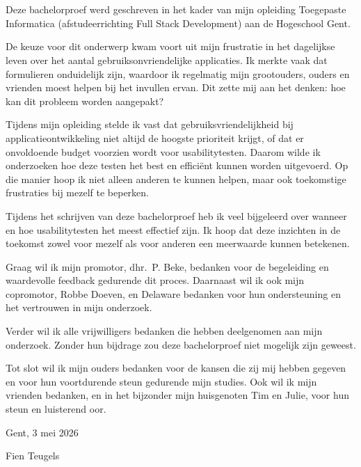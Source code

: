 
\chapter*{}%
\label{ch:voorwoord}

Deze bachelorproef werd geschreven in het kader van mijn opleiding Toegepaste Informatica (afstudeerrichting Full Stack Development) aan de Hogeschool Gent.

De keuze voor dit onderwerp kwam voort uit mijn frustratie in het dagelijkse leven over het aantal gebruiksonvriendelijke applicaties. Ik merkte vaak dat formulieren onduidelijk zijn, waardoor ik regelmatig mijn grootouders, ouders en vrienden moest helpen bij het invullen ervan. Dit zette mij aan het denken: hoe kan dit probleem worden aangepakt?

Tijdens mijn opleiding stelde ik vast dat gebruiksvriendelijkheid bij applicatieontwikkeling niet altijd de hoogste prioriteit krijgt, of dat er onvoldoende budget voorzien wordt voor usabilitytesten. Daarom wilde ik onderzoeken hoe deze testen het best en efficiënt kunnen worden uitgevoerd. Op die manier hoop ik niet alleen anderen te kunnen helpen, maar ook toekomstige frustraties bij mezelf te beperken.

Tijdens het schrijven van deze bachelorproef heb ik veel bijgeleerd over wanneer en hoe usabilitytesten het meest effectief zijn. Ik hoop dat deze inzichten in de toekomst zowel voor mezelf als voor anderen een meerwaarde kunnen betekenen.

Graag wil ik mijn promotor, dhr.\ P. Beke, bedanken voor de begeleiding en waardevolle feedback gedurende dit proces. Daarnaast wil ik ook mijn copromotor, Robbe Doeven, en Delaware bedanken voor hun ondersteuning en het vertrouwen in mijn onderzoek.

Verder wil ik alle vrijwilligers bedanken die hebben deelgenomen aan mijn onderzoek. Zonder hun bijdrage zou deze bachelorproef niet mogelijk zijn geweest.

Tot slot wil ik mijn ouders bedanken voor de kansen die zij mij hebben gegeven en voor hun voortdurende steun gedurende mijn studies. Ook wil ik mijn vrienden bedanken, en in het bijzonder mijn huisgenoten Tim en Julie, voor hun steun en luisterend oor.

\bigskip
\noindent Gent, 3 mei 2026

\medskip
\noindent Fien Teugels